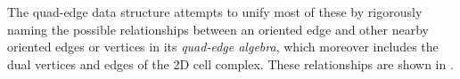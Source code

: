 The quad-edge data structure \citep{Guibas85} attempts to unify most of these by rigorously naming the possible relationships between an oriented edge and other nearby oriented edges or vertices in its \emph{quad-edge algebra}, which moreover includes the dual vertices and edges of the 2D cell complex.
These relationships are shown in .
\begin{figure}[tbp]
\centering
{}
\quad
\subfloat[]{
}
\end{figure}
